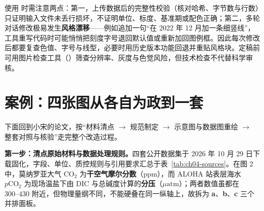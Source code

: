 \begin{sloppypar}
使用  时需注意两点：第一，上传数据后的完整性校验（核对哈希、字节数与行数）只证明输入文件未丢行损坏，不证明单位、标度、基准期或配色正确；第二，多轮对话修改极易发生\textbf{风格漂移}——例如追加一句“在 2022 年 12 月加一条细竖线”，工具重写代码时可能悄悄把刻度字号退回默认值或重新加回图例框。因此每次修改后都要复查色值、字号与线型，必要时用历史版本功能回退并重贴风格块。定稿前可用图片检查工具（）筛查分辨率、灰度与色觉风险，但技术检查不代替科学审核。
\end{sloppypar}

\section{案例：四张图从各自为政到一套}

下面回到小宋的论文，按“材料清点 $\rightarrow$ 规范制定 $\rightarrow$ 示意图与数据图重绘 $\rightarrow$ 整套对照与核验”走完整个改造过程。

\textbf{第一步：清点原始材料与数据处理规则。}四套公开数据集于 2026 年 10 月 29 日下载固化，字段、单位、质控规则与引用要求汇总于表~\ref{tab:ch04-sources}。在图 2 中，莫纳罗亚大气 $\text{CO}_2$ 为\textbf{干空气摩尔分数}（ppm），而 ALOHA 站表层海水 $p\text{CO}_2$ 为现场温盐下由 DIC 与总碱度计算的\textbf{分压}（$\mu\text{atm}$）；两者数值虽都在 $300\text{--}430$ 附近，但物理量纲不同，不能硬叠在同一纵轴上，故拆为 \textbf{a}、\textbf{b}、\textbf{c} 三个并排面板。

